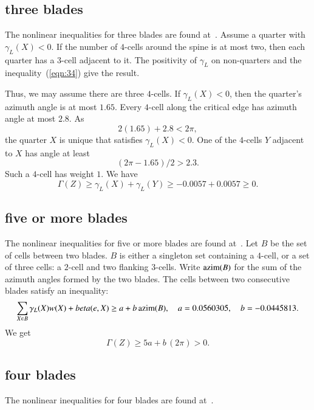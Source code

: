 \subsection{three blades}

The nonlinear inequalities for three blades are found at~\cite[cc:3bl:BIXPCGW]{hales:2009:nonlinear}.  Assume a quarter with $\gamma_L(X) < 0$.  If the number of $4$-cells around the spine is at most two, then each quarter has a $3$-cell adjacent to it.  The positivity of $\gamma_L$ on non-quarters and the inequality~(\ref{eqn:34}) give the result.  

Thus, we may assume there are three $4$-cells. If $\gamma_L(X)< 0$, then the quarter's azimuth angle is at most $1.65$. Every $4$-cell along the critical edge has azimuth angle at most $2.8$.  As
$$
2 (1.65) + 2.8 < 2 \pi,
$$
the quarter $X$ is unique that satisfies $\gamma_L(X)< 0$.  One of the $4$-cells $Y$ adjacent to $X$ has angle at least 
$$
(2\pi - 1.65)/2 > 2.3.
$$
Such a $4$-cell has weight $1$. We have
$$
\Gamma(Z)\ge \gamma_L(X) + \gamma_L(Y) \ge -0.0057 + 0.0057 \ge0.
$$



\subsection{five or more blades}

The nonlinear inequalities for five or more blades are found at~\cite[cc:5bl:ZTGIJCF]{hales:2009:nonlinear}.   Let $B$ be the set of cells between two blades.  $B$ is either a singleton set containing a $4$-cell, or a set of three cells: a $2$-cell and two flanking $3$-cells.  Write ${\operatorname{azim}}(B)$ for the sum of the azimuth angles formed by the two blades.   The cells between two consecutive blades satisfy an inequality:
$$
\sum_{X\in B} \gamma_L(X)w(X) + beta(e,X) \ge a + b\,{\operatorname{azim}}(B),
\quad a= 0.0560305, \quad b= -0.0445813.
$$
We get
$$
\Gamma(Z) \ge 5 a + b\, (2\pi) > 0.
$$

\subsection{four blades}

The nonlinear inequalities for four blades are found at~\cite[cc:4bl:QITNPEA]{hales:2009:nonlinear}.


